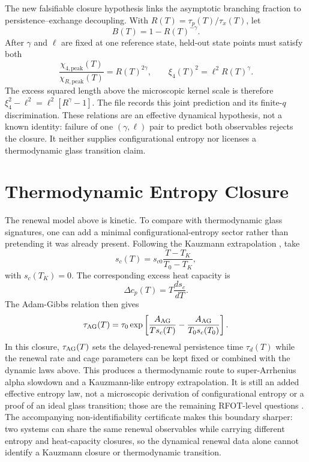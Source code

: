 \documentclass[aps,preprint,onecolumn,superscriptaddress,nofootinbib]{revtex4-2}
\begin{document}
The new falsifiable closure hypothesis links the asymptotic branching fraction
to persistence--exchange decoupling.  With
$R(T)=\tau_p(T)/\tau_x(T)$, let
\begin{equation}
  B(T)=1-R(T)^{-\gamma}.
\end{equation}
After $\gamma$ and $\ell$ are fixed at one reference state, held-out state
points must satisfy both
\begin{equation}
  \frac{\chi_{4,\mathrm{peak}}(T)}{\chi_{R,\mathrm{peak}}(T)}
  =R(T)^{2\gamma},
  \qquad
  \xi_4(T)^2=\ell^2R(T)^\gamma.
\end{equation}
The excess squared length above the microscopic kernel scale is therefore
$\xi_4^2-\ell^2=\ell^2[R^\gamma-1]$.
The file \texttt{}
records this joint prediction and its finite-$q$ discrimination.  These
relations are an effective dynamical hypothesis, not a known identity: failure
of one $(\gamma,\ell)$ pair to predict both observables rejects the closure.
It neither supplies configurational entropy nor licenses a thermodynamic glass
transition claim.

\section{Thermodynamic Entropy Closure}

The renewal model above is kinetic. To compare with thermodynamic glass
signatures, one can add a minimal configurational-entropy sector rather than
pretending it was already present. Following the Kauzmann extrapolation
\cite{kauzmann1948nature}, take
\begin{equation}
  s_c(T)=s_{c0}\frac{T-T_K}{T_0-T_K},
\end{equation}
with $s_c(T_K)=0$. The corresponding excess heat capacity is
\begin{equation}
  \Delta c_p(T)=T\frac{ds_c}{dT}.
\end{equation}
The Adam-Gibbs relation \cite{adam1965temperature} then gives
\begin{equation}
  \tau_{\rm AG}(T)=\tau_0
  \exp\left[
    \frac{A_{\rm AG}}{T s_c(T)}
    -\frac{A_{\rm AG}}{T_0 s_c(T_0)}
  \right].
\end{equation}
In this closure, $\tau_{\rm AG}(T)$ sets the delayed-renewal persistence time
$\tau_d(T)$ while the renewal rate and cage parameters can be kept fixed or
combined with the dynamic laws above. This produces a thermodynamic route to
super-Arrhenius alpha slowdown and a Kauzmann-like entropy extrapolation. It is
still an added effective entropy law, not a microscopic derivation of
configurational entropy or a proof of an ideal glass transition; those are the
remaining RFOT-level questions
\cite{lubchenko2007theory,berthier2011theoretical}.
The accompanying non-identifiability certificate makes this boundary sharper:
two systems can share the same renewal observables while carrying different
entropy and heat-capacity closures, so the dynamical renewal data alone cannot
identify a Kauzmann closure or thermodynamic transition.
\end{document}

